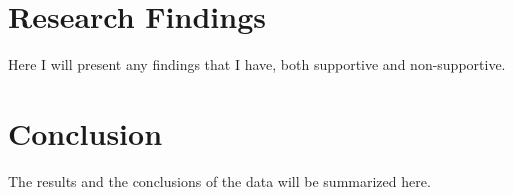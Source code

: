 \documentclass{article}
\begin{document}
\section{Research Findings}
Here I will present any findings that I have, both supportive and non-supportive. 

\section{Conclusion}
The results and the  conclusions of the data will be summarized here. 



\end{document}
